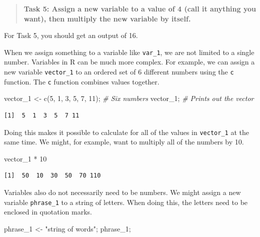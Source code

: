 \documentclass[
]{scrbook}
\newenvironment{Shaded}{\begin{snugshade}}{\end{snugshade}}
\newcommand{\CommentTok}[1]{\textcolor[rgb]{0.56,0.35,0.01}{\textit{#1}}}
\newcommand{\DecValTok}[1]{\textcolor[rgb]{0.00,0.00,0.81}{#1}}
\newcommand{\FunctionTok}[1]{\textcolor[rgb]{0.00,0.00,0.00}{#1}}
\newcommand{\NormalTok}[1]{#1}
\newcommand{\OtherTok}[1]{\textcolor[rgb]{0.56,0.35,0.01}{#1}}
\newcommand{\SpecialCharTok}[1]{\textcolor[rgb]{0.00,0.00,0.00}{#1}}
\newcommand{\StringTok}[1]{\textcolor[rgb]{0.31,0.60,0.02}{#1}}
\begin{document}
\begin{quote}
\textbf{Task 5: Assign a new variable to a value of 4 (call it anything you want), then multiply the new variable by itself.}
\end{quote}

For Task 5, you should get an output of 16.

When we assign something to a variable like \texttt{var\_1}, we are not limited to a single number.
Variables in R can be much more complex.
For example, we can assign a new variable \texttt{vector\_1} to an ordered set of 6 different numbers using the \texttt{c} function.
The \texttt{c} function combines values together.

\begin{Shaded}
\begin{Highlighting}[]
\NormalTok{vector\_1 }\OtherTok{\textless{}{-}} \FunctionTok{c}\NormalTok{(}\DecValTok{5}\NormalTok{, }\DecValTok{1}\NormalTok{, }\DecValTok{3}\NormalTok{, }\DecValTok{5}\NormalTok{, }\DecValTok{7}\NormalTok{, }\DecValTok{11}\NormalTok{); }\CommentTok{\# Six numbers}
\NormalTok{vector\_1;      }\CommentTok{\# Prints out the vector}
\end{Highlighting}
\end{Shaded}

\begin{verbatim}
[1]  5  1  3  5  7 11
\end{verbatim}

Doing this makes it possible to calculate for all of the values in \texttt{vector\_1} at the same time.
We might, for example, want to multiply all of the numbers by 10.

\begin{Shaded}
\begin{Highlighting}[]
\NormalTok{vector\_1 }\SpecialCharTok{*} \DecValTok{10}
\end{Highlighting}
\end{Shaded}

\begin{verbatim}
[1]  50  10  30  50  70 110
\end{verbatim}

Variables also do not necessarily need to be numbers.
We might assign a new variable \texttt{phrase\_1} to a string of letters.
When doing this, the letters need to be enclosed in quotation marks.

\begin{Shaded}
\begin{Highlighting}[]
\NormalTok{phrase\_1 }\OtherTok{\textless{}{-}} \StringTok{"string of words"}\NormalTok{;}
\NormalTok{phrase\_1;}
\end{Highlighting}
\end{Shaded}
\end{document}
